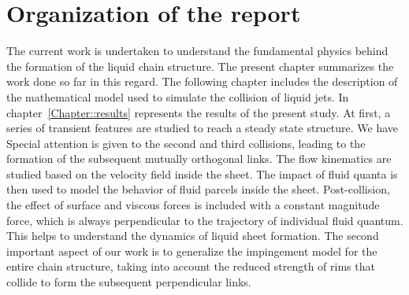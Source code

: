 \section{Organization of the report}
The current work is undertaken to understand the fundamental physics behind the formation of the liquid chain structure. The present chapter summarizes the work done so far in this regard. The following chapter includes the description of the mathematical model used to simulate the collision of liquid jets. In chapter~\ref{Chapter::results} represents the results of the present study. At first, a series of transient features are studied to reach a steady state structure. We have  Special attention is given to the second and third collisions, leading to the formation of the subsequent mutually orthogonal links. The flow kinematics are studied based on the velocity field inside the sheet. The impact of fluid quanta is then used to model the behavior of fluid parcels inside the sheet. Post-collision, the effect of surface and viscous forces is included with a constant magnitude force, which is always perpendicular to the trajectory of individual fluid quantum. This helps to understand the dynamics of liquid sheet formation. The second important aspect of our work is to generalize the impingement model for the entire chain structure, taking into account the reduced strength of rims that collide to form the subsequent perpendicular links.
